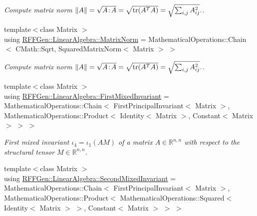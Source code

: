 \begin{DoxyCompactItemize}
\begin{DoxyCompactList}\small\item\em Compute matrix norm $ \|A\| = \sqrt{A\negthinspace : \negthinspace A }= \sqrt{\mathrm{tr}(A^TA)} = \sqrt{\sum_{i,j} A_{ij}^2}. $. \end{DoxyCompactList}\item 
\hypertarget{group__LinearAlgebraGroup_gaa59381731a80fe009e56f86f78ebc703}{{\footnotesize template$<$class Matrix $>$ }\\using \hyperlink{group__LinearAlgebraGroup_gaa59381731a80fe009e56f86f78ebc703}{R\-F\-F\-Gen\-::\-Linear\-Algebra\-::\-Matrix\-Norm} = Mathematical\-Operations\-::\-Chain$<$ C\-Math\-::\-Sqrt, Squared\-Matrix\-Norm$<$ Matrix $>$ $>$}\label{group__LinearAlgebraGroup_gaa59381731a80fe009e56f86f78ebc703}

\begin{DoxyCompactList}\small\item\em Compute matrix norm $ \|A\| = \sqrt{A\negthinspace : \negthinspace A }= \sqrt{\mathrm{tr}(A^TA)} = \sqrt{\sum_{i,j} A_{ij}^2}. $. \end{DoxyCompactList}\item 
\hypertarget{group__LinearAlgebraGroup_ga9896f1432dd23593f147c31c0be9ccde}{{\footnotesize template$<$class Matrix $>$ }\\using \hyperlink{group__LinearAlgebraGroup_ga9896f1432dd23593f147c31c0be9ccde}{R\-F\-F\-Gen\-::\-Linear\-Algebra\-::\-First\-Mixed\-Invariant} = Mathematical\-Operations\-::\-Chain$<$ First\-Principal\-Invariant$<$ Matrix $>$, Mathematical\-Operations\-::\-Product$<$ Identity$<$ Matrix $>$, Constant$<$ Matrix $>$ $>$ $>$}\label{group__LinearAlgebraGroup_ga9896f1432dd23593f147c31c0be9ccde}

\begin{DoxyCompactList}\small\item\em First mixed invariant $ \iota_4=\iota_1(AM) $ of a matrix $A\in\mathbb{R}^{n,n}$ with respect to the structural tensor $M\in\mathbb{R}^{n,n}$. \end{DoxyCompactList}\item 
\hypertarget{group__LinearAlgebraGroup_ga95c502f232d267e4f199747024152206}{{\footnotesize template$<$class Matrix $>$ }\\using \hyperlink{group__LinearAlgebraGroup_ga95c502f232d267e4f199747024152206}{R\-F\-F\-Gen\-::\-Linear\-Algebra\-::\-Second\-Mixed\-Invariant} = Mathematical\-Operations\-::\-Chain$<$ First\-Principal\-Invariant$<$ Matrix $>$, Mathematical\-Operations\-::\-Product$<$ Mathematical\-Operations\-::\-Squared$<$ Identity$<$ Matrix $>$ $>$, Constant$<$ Matrix $>$ $>$ $>$}\label{group__LinearAlgebraGroup_ga95c502f232d267e4f199747024152206}


\end{DoxyCompactItemize}
